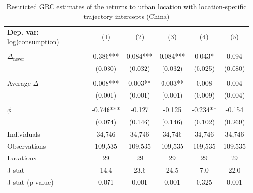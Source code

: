 \begin{table}[htbp] \centering \begin{threeparttable}
 \caption{Restricted GRC estimates of the returns to urban location with location-specific trajectory intercepts (China)} 
 \label{tab:verdier_robust_twostep_CHN_consumption_urban_unb} 
\begin{tabular}{l ccccc} \toprule  \textbf{Dep. var:}  log(consumption) 
                    &\multicolumn{1}{c}{(1)}   &\multicolumn{1}{c}{(2)}   &\multicolumn{1}{c}{(3)}   &\multicolumn{1}{c}{(4)}   &\multicolumn{1}{c}{(5)}   \\
                    &               &               &               &               &               \\
\addlinespace
$\Delta_{\text{never}}$&       0.386***&       0.084***&       0.084***&       0.043*  &       0.094   \\
                    &     (0.030)   &     (0.032)   &     (0.032)   &     (0.025)   &     (0.080)   \\
                    &               &               &               &               &               \\
\addlinespace
Average $\Delta$    &       0.008***&       0.003** &       0.003** &       0.008   &       0.004   \\
                    &     (0.001)   &     (0.001)   &     (0.001)   &     (0.009)   &     (0.004)   \\
                    &               &               &               &               &               \\
\addlinespace
$\phi$              &      -0.746***&      -0.127   &      -0.125   &      -0.234** &      -0.154   \\
                    &     (0.074)   &     (0.146)   &     (0.146)   &     (0.102)   &     (0.269)   \\
\addlinespace
Individuals         &      34,746   &      34,746   &      34,746   &      34,746   &      34,746   \\
Observations        &     109,535   &     109,535   &     109,535   &     109,535   &     109,535   \\
Locations           &          29   &          29   &          29   &          29   &          29   \\
J-stat              &        14.4   &        23.6   &        24.5   &         7.0   &        22.0   \\
J-stat (p-value)    &       0.071   &       0.001   &       0.001   &       0.325   &       0.001   \\

\end{tabular}
\end{threeparttable}
\end{table}
